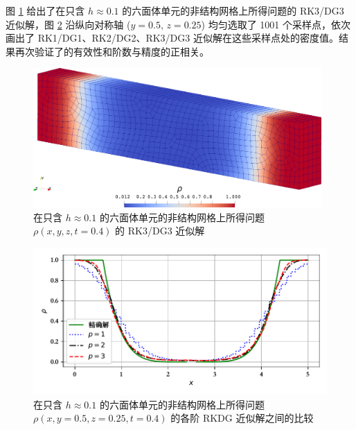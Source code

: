 图 \ref{fig:vacuum_hexa} 给出了在只含 $h\approx0.1$ 的六面体单元的非结构网格上所得问题的
RK3/DG3 近似解，图 \ref{fig:vacuum_hexa_p_vary} 沿纵向对称轴 ($y=0.5,\,z=0.25$)
均匀选取了 1001 个采样点，依次画出了 RK1/DG1、RK2/DG2、RK3/DG3 近似解在这些采样点处的密度值。结果再次验证了的有效性和阶数与精度的正相关。

\begin{figure}[h!]
\begin{centering}
\includegraphics[width=0.98\textwidth]{../mdpi/figures/shock_tubes/vacuum/contour}
\par\end{centering}
\caption{\label{fig:vacuum_hexa}在只含 $h\approx0.1$ 的六面体单元的非结构网格上所得问题
$\rho(x,y,z,t=0.4)$ 的 RK3/DG3 近似解}
\end{figure}

\begin{figure}[h!]
\begin{centering}
\includegraphics[width=1\textwidth,height=0.3\textheight,keepaspectratio]{figures/shock_tubes/vacuum/result}
\par\end{centering}
\caption{\label{fig:vacuum_hexa_p_vary}在只含 $h\approx0.1$ 的六面体单元的非结构网格上所得问题
$\rho(x,y=0.5,z=0.25,t=0.4)$ 的各阶 RKDG 近似解之间的比较}
\end{figure}

